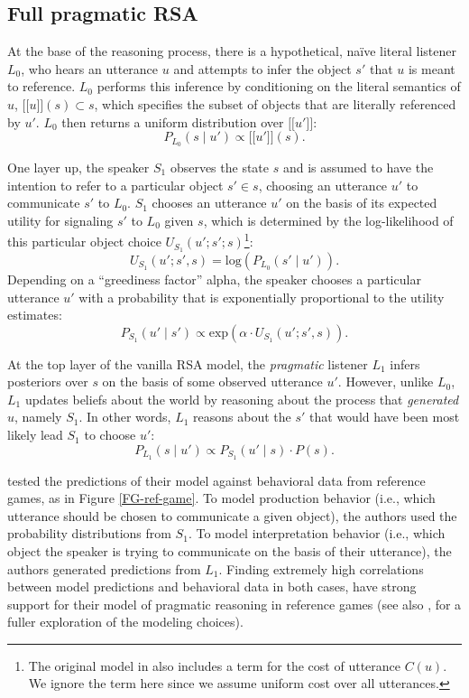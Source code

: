 \documentclass[10pt,a4paper]{article}
\newcommand{\sem}[1]{\mbox{$[\![$#1$]\!]$}}
\begin{document}
\subsection{Full pragmatic RSA}



At the base of the reasoning process, there is a hypothetical, na\"ive literal listener $L_0$, who hears an utterance $u$ and attempts to infer the object $s'$ that $u$ is meant to reference.
$L_0$ performs this inference by conditioning on the literal semantics of $u$, \sem{$u$}$(s)\subset s$, which specifies the subset of objects that are literally referenced by $u'$. 
$L_0$ then returns a uniform distribution over \sem{$u'$}:
$$P_{L_{0}}(s\mid u') \propto \sem{$u'$}(s).$$

One layer up, the speaker $S_1$ observes the state $s$ and is assumed to have the intention to refer to a particular object $s' \in s$, choosing an utterance $u'$ to communicate $s'$ to $L_0$.
$S_1$ chooses an utterance $u'$ on the basis of its expected utility for signaling $s'$ to $L_0$ given $s$, which is determined by the log-likelihood of this particular object choice $U_{S_1}(u';s';s)$\footnote{The original model in  also includes a term for the cost of utterance $C(u)$. We ignore the term here since we assume uniform cost over all utterances.}:
$$U_{S_{1}}(u';s',s) = \textrm{log}(P_{L_{0}}(s' \mid u')).$$ 
Depending on a ``greediness factor'' alpha, the speaker chooses a particular utterance $u'$ with a probability that is exponentially proportional to the utility estimates: 
$$P_{S_{1}} (u' \mid s') \propto   \textrm{exp}(\alpha \cdot U_{S_{1}} (u';s',s)).$$

At the top layer of the vanilla RSA model, the \emph{pragmatic} listener $L_1$ infers posteriors over $s$ on the basis of some observed utterance $u'$.
However, unlike $L_0$, $L_1$ updates beliefs about the world by reasoning about the process that \emph{generated} $u$, namely $S_1$.
In other words, $L_1$ reasons about the $s'$ that would have been most likely lead $S_1$ to choose $u'$:
$$P_{L_{1}}(s\mid u') \propto P_{S_{1}}(u' \mid s) \cdot P(s).$$

 tested the predictions of their model against behavioral data from reference games, as in Figure \ref{FG-ref-game}.
To model production behavior (i.e., which utterance should be chosen to communicate a given object), the authors used the probability distributions from $S_1$.
To model interpretation behavior (i.e., which object the speaker is trying to communicate on the basis of their utterance), the authors generated predictions from $L_1$.
Finding extremely high correlations between model predictions and behavioral data in both cases, \citeauthor{frankgoodman2012} have strong support for their model of pragmatic reasoning in reference games (see also , for a fuller exploration of the modeling choices).
\end{document}
